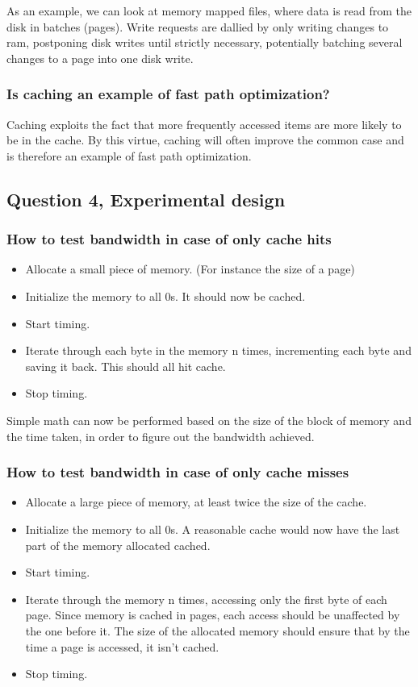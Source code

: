 \documentclass[11pt,a4paper]{article}
\begin{document}
As an example, we can look at memory mapped files, where data is read from the
disk in batches (pages).
Write requests are dallied by only writing changes to ram, postponing disk
writes until strictly necessary, potentially batching several changes to a page
into one disk write.

\subsubsection{Is caching an example of fast path optimization?}

Caching exploits the fact that more frequently accessed items are more likely
to be in the cache. By this virtue, caching will often improve the common case
and is therefore an example of fast path optimization.

\subsection{Question 4, Experimental design}
\subsubsection{How to test bandwidth in case of only cache hits}
\begin{itemize}
    \item Allocate a small piece of memory. (For instance the size of a page)
    \item Initialize the memory to all 0s. It should now be cached.
    \item Start timing.
    \item Iterate through each byte in the memory n times, incrementing each byte
          and saving it back. This should all hit cache.
    \item Stop timing.
\end{itemize}

Simple math can now be performed based on the size of the block of memory and
the time taken, in order to figure out the bandwidth achieved.

\subsubsection{How to test bandwidth in case of only cache misses}
\begin{itemize}
    \item Allocate a large piece of memory, at least twice the size of the cache.
    \item Initialize the memory to all 0s. A reasonable cache would now have the last part of the memory allocated cached. 
    \item Start timing.
    \item Iterate through the memory n times, accessing only the first byte
          of each page. Since memory is cached in pages, each access should be
          unaffected by the one before it. The size of the allocated memory should
          ensure that by the time a page is accessed, it isn't cached.
    \item Stop timing.
\end{itemize}
\end{document}

